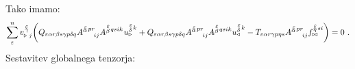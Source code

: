Tako imamo:
\begin{equation}
   \sum^n_\varepsilon v^{\mkern 2mu \substack{\varepsilon \\[-0.65mm] \gamma \\[-0.2mm]}}_{\triangleright \mkern5mu j}
   \qty( Q_{\varepsilon   \alpha r   \beta s   \gamma p   \delta q}
   A^{\substack{\mkern2mu \varepsilon \\[-0.65mm] \alpha} \mkern2mu p r}_{\mkern29mu i j}
   A^{\substack{\mkern2mu \varepsilon \\[0.05mm] \beta} \mkern2mu q s i k} \mkern1mu
   u^{\substack{\mkern2mu \varepsilon \\[0.09mm] \delta} \mkern2mu k}_\triangleright
   +
   Q_{\varepsilon   \alpha r   \beta s   \gamma p   \delta q}
   A^{\substack{\mkern2mu \varepsilon \\[-0.65mm] \alpha} \mkern2mu p r}_{\mkern29mu i j}
   A^{\substack{\mkern2mu \varepsilon \\[0.05mm] \beta} \mkern2mu q s i k}
   u^{\substack{\mkern2mu \varepsilon \\[0.09mm] \delta} \mkern2mu k}_\triangleleft
   -
   T_{\varepsilon   \alpha r   \gamma p   \eta s}
   A^{\substack{\mkern2mu \varepsilon \\[-0.65mm] \alpha} \mkern2mu p r}_{\mkern29mu i j}
   f^{\substack{\mkern2mu \varepsilon \\[-0.59mm] \eta} \mkern2mu s i}_{\bowtie}
   ) = 0 \ .
\end{equation}
Sestavitev globalnega tenzorja:
